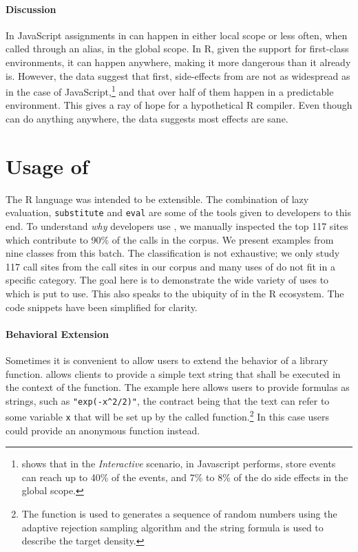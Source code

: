 \documentclass[review,screen,acmsmall]{acmart}%
\renewcommand{\k}[1]{\lstinline |#1|\xspace}
\begin{document}
\paragraph{Discussion} In JavaScript assignments in \eval can happen in either
local scope or less often, when called through an alias, in the global scope.
In R, given the support for first-class environments, it can happen anywhere,
making it \eval more dangerous than it already is. However, the data suggest
that first, side-effects from \eval are not as widespread as in the case of
JavaScript,\footnote{\citep{ecoop11} shows that in the \emph{Interactive}
  scenario, \eval in Javascript performs, store events can reach up to 40\% of
the events, and 7\% to 8\% of the \eval do side effects in the global scope. }
and that over half of them happen in a predictable environment. This gives a
ray of hope for a hypothetical R compiler. Even though \eval can do anything
anywhere, the data suggests most effects are sane.

\section{Usage of \eval}

The R language was intended to be extensible. The combination of lazy
evaluation, \k{substitute} and \k{eval} are some of the tools given to
developers to this end. To understand \emph{why} developers use \eval, we
manually inspected the top 117 sites which contribute to 90\% of the calls in the
corpus. We present examples from nine classes from this batch. The
classification is not exhaustive; we only study 117 call sites from the
\PkgEvalCallSites call sites in our corpus and many uses of \eval do not fit in
a specific category. The goal here is to demonstrate the wide variety of uses to
which \eval is put to use. This also speaks to the ubiquity of \eval in the R
ecosystem. The code snippets have been simplified for clarity.



\paragraph{Behavioral Extension} Sometimes it is convenient to allow users to
extend the behavior of a library function. \Eval allows clients to provide a
simple text string that shall be executed in the context of the function. The
example here allows users to provide formulas as strings, such as
\k{"exp(-x^2/2)"}, the contract being that the text can refer to some variable
\k{x} that will be set up by the called function.\footnote{The function is used
to generates a sequence of random numbers using the adaptive rejection sampling
algorithm and the string formula is used to describe the target density.} In
this case users could provide an anonymous function instead.
\end{document}
